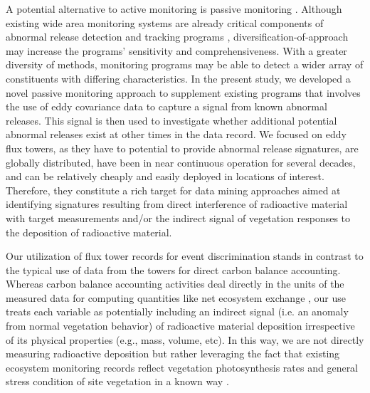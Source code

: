 \documentclass{article}
\begin{document}
A potential alternative to active monitoring is passive monitoring \citep[e.g., the German Integrated Measuring and Information system and the International Monitoring System,][]{bieringerMonitoringGroundlevelAir2004}. Although existing wide area monitoring systems are already critical components of abnormal release detection and tracking programs \citep{mediciIMSRadionuclideNetwork2001}, diversification-of-approach may increase the programs' sensitivity and comprehensiveness. With a greater diversity of methods, monitoring programs may be able to detect a wider array of constituents with differing characteristics. In the present study, we developed a novel passive monitoring approach to supplement existing programs that involves the use of eddy covariance data to capture a signal from known abnormal releases. This signal is then used to investigate whether additional potential abnormal releases exist at other times in the data record. We focused on eddy flux towers, as they have to potential to provide abnormal release signatures, are globally distributed, have been in near continuous operation for several decades, and can be relatively cheaply and easily deployed in locations of interest. Therefore, they constitute a rich target for data mining approaches aimed at identifying signatures resulting from direct interference of radioactive material with target measurements and/or the indirect signal of vegetation responses to the deposition of radioactive material.

Our utilization of flux tower records for event discrimination stands in contrast to the typical use of data from the towers for direct carbon balance accounting. Whereas carbon balance accounting activities deal directly in the units of the measured data for computing quantities like net ecosystem exchange \citep{baldocchiInterannualVariabilityNet2018}, our use treats each variable as potentially including an indirect signal (i.e. an anomaly from normal vegetation behavior) of radioactive material deposition irrespective of its physical properties (e.g., mass, volume, etc). In this way, we are not directly measuring radioactive deposition but rather leveraging the fact that existing ecosystem monitoring records reflect vegetation photosynthesis rates and general stress condition of site vegetation in a known way \citep{nobelPhysicochemicalEnvironmentalPlant2020}.
\end{document}
